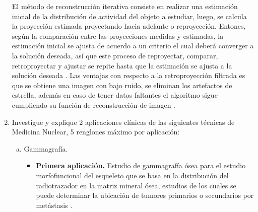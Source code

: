 \begin{enumerate}[1.]
El método de reconstrucción iterativa consiste en realizar una estimación inicial de la distribución de actividad del objeto a estudiar, luego, se calcula la proyección estimada proyectando hacia adelante o reproyección. Entones, según la comparación entre las proyecciones medidas y estimadas, la estimación inicial se ajusta de acuerdo a un criterio el cual deberá converger a la solución deseada, así que este proceso de reproyectar, comparar, retroproyectar y ajustar se repite hasta que la estimación se ajusta a la solución deseada \citep{smith}. Las ventajas con respecto a la retroproyección filtrada es que se obtiene una imagen con bajo ruido, se eliminan los artefactos de estrella, además en caso de tener datos faltantes el algoritmo sigue cumpliendo su función de reconstrucción de imagen \citep{smith,IM}.




\pagebreak





  \item Investigue y explique 2 aplicaciones clínicas de las siguientes técnicas de Medicina Nuclear, 5   renglones máximo por aplicación:
  \begin{enumerate}[a.]
    \item Gammagrafía.
    \begin{itemize}
      \item \textbf{Primera aplicación.} Estudio de gammagrafía ósea para el estudio morfofuncional del esqueleto que se basa en la distribución del radiotrazador en la matriz mineral ósea, estudios de los cuales se puede determinar la ubicación de tumores primarios o secundarios por metástasis \citep{app1}.
      



\end{itemize}
\end{enumerate}
\end{enumerate}
